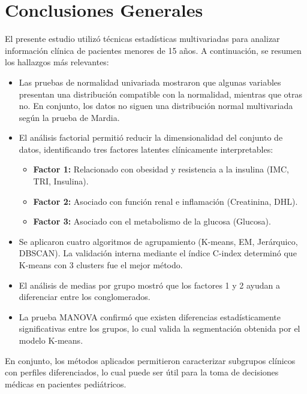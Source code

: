 \documentclass[12pt]{report}
\begin{document}
\newpage
\section{Conclusiones Generales}

El presente estudio utilizó técnicas estadísticas multivariadas para analizar información clínica de pacientes menores de 15 años. A continuación, se resumen los hallazgos más relevantes:

\begin{itemize}
    \item Las pruebas de normalidad univariada mostraron que algunas variables presentan una distribución compatible con la normalidad, mientras que otras no. En conjunto, los datos no siguen una distribución normal multivariada según la prueba de Mardia.

    \item El análisis factorial permitió reducir la dimensionalidad del conjunto de datos, identificando tres factores latentes clínicamente interpretables:
    \begin{itemize}
        \item \textbf{Factor 1:} Relacionado con obesidad y resistencia a la insulina (IMC, TRI, Insulina).
        \item \textbf{Factor 2:} Asociado con función renal e inflamación (Creatinina, DHL).
        \item \textbf{Factor 3:} Asociado con el metabolismo de la glucosa (Glucosa).
    \end{itemize}

    \item Se aplicaron cuatro algoritmos de agrupamiento (K-means, EM, Jerárquico, DBSCAN). La validación interna mediante el índice C-index determinó que K-means con 3 clusters fue el mejor método.

    \item El análisis de medias por grupo mostró que los factores 1 y 2 ayudan a diferenciar entre los conglomerados.

    \item La prueba MANOVA confirmó que existen diferencias estadísticamente significativas entre los grupos, lo cual valida la segmentación obtenida por el modelo K-means.
\end{itemize}

\noindent En conjunto, los métodos aplicados permitieron caracterizar subgrupos clínicos con perfiles diferenciados, lo cual puede ser útil para la toma de decisiones médicas en pacientes pediátricos.
\end{document}
